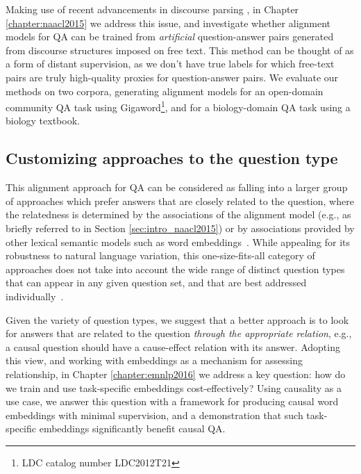 Making use of recent advancements in discourse parsing \citep{feng12}, in Chapter \ref{chapter:naacl2015} we address this issue, and investigate whether alignment models for QA can be trained from \emph{artificial} question-answer pairs generated from discourse structures imposed on free text. This method can be thought of as a form of distant supervision, as we don't have true labels for which free-text pairs are truly high-quality proxies for question-answer pairs.
We evaluate our methods on two corpora, generating alignment models for an open-domain community QA task using Gigaword\footnote{LDC catalog number LDC2012T21}, and for a biology-domain QA task using a biology textbook. 


\subsection{Customizing approaches to the question type}
\label{sec:intro_emnlp2016}

This alignment approach for QA can be considered as falling into a larger group of approaches which prefer answers that are closely related to the question, where the relatedness is determined by the associations of the alignment model (e.g., as briefly referred to in Section \ref{sec:intro_naacl2015}) or by associations provided by other lexical semantic models such as word embeddings~\citep{yih13,jansen14,fried2015higher}. 
While appealing for its robustness to natural language variation, this one-size-fits-all category of approaches does not take into account the wide range of distinct question types that can appear in any given question set, and that are best addressed individually~\citep{chu2004ibm,ferrucci2010building,clark2013study}.  

Given the variety of question types, we suggest that a better approach is to look for answers that are related to the question \emph{through the appropriate relation}, e.g., a causal question should have a cause-effect relation with its answer.
Adopting this view, and working with embeddings as a mechanism for assessing relationship, in Chapter \ref{chapter:emnlp2016} we address a key question: how do we train and use task-specific embeddings cost-effectively? 
Using causality as a use case, we answer this question with a framework for producing causal word embeddings with minimal supervision, and a demonstration that such task-specific embeddings significantly benefit causal QA. 

